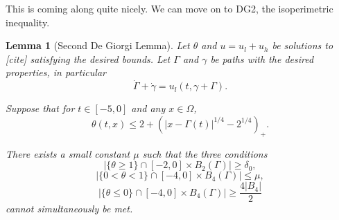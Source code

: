 \documentclass[11pt]{amsart}
\newtheorem{lemma}[theorem]{Lemma}
\theoremstyle{remark}
\theoremstyle{definition}
\newcommand{\paren}[1]{\left( #1 \right)}
\newcommand{\abs}[1]{\left\lvert #1 \right\rvert}
\newcommand{\ulow}{u_l}
\newcommand{\uhigh}{u_h}
\begin{document}
This is coming along quite nicely.  We can move on to DG2, the isoperimetric inequality.  

\begin{lemma}[Second De Giorgi Lemma] \label{thm:DG2}
Let $\theta$ and $u = \ulow + \uhigh$ be solutions to [cite] satisfying the desired bounds.  Let $\Gamma$ and $\gamma$ be paths with the desired properties, in particular
\[ \dot{\Gamma} +\dot{\gamma} = \ulow(t,\gamma + \Gamma). \]

Suppose that for $t \in [-5,0]$ and any $x \in \Omega$,
\[ \theta(t,x) \leq 2 + \paren{|x-\Gamma(t)|^{1/4}-2^{1/4}}_+. \]

There exists a small constant $\mu$ such that the three conditions
\[ \abs{\{\theta \geq 1\} \cap [-2,0]\times B_2(\Gamma)} \geq \delta_0, \]
\[ \abs{\{0 < \theta < 1\} \cap [-4,0]\times B_4(\Gamma)} \leq \mu, \]
\[ \abs{\{\theta \leq 0\} \cap [-4,0]\times B_4(\Gamma)} \geq \frac{4 |B_4|}{2} \]
cannot simultaneously be met.  
\end{lemma}
\end{document}
